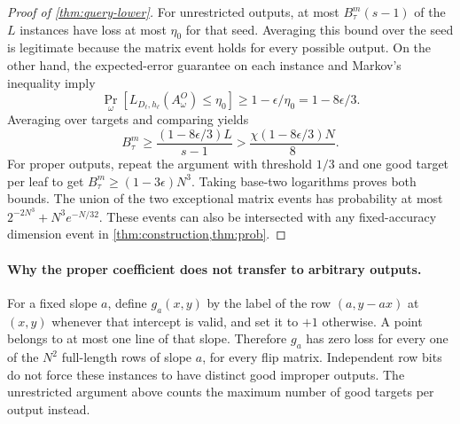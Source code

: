\begin{proof}[Proof of \cref{thm:query-lower}]
For unrestricted outputs, at most $B_\tau^m(s-1)$ of the $L$ instances have loss at most $\eta_0$ for that seed. Averaging this bound over the seed is legitimate because the matrix event holds for every possible output. On the other hand, the expected-error guarantee on each instance and Markov's inequality imply
\[
 \Pr_\omega[L_{D_\ell,h_\ell}(A^O_\omega)\le\eta_0]
 \ge1-\epsilon/\eta_0=1-8\epsilon/3.
\]
Averaging over targets and comparing yields
\[
 B_\tau^m\ge
 \frac{(1-8\epsilon/3)L}{s-1}
 >\frac{\chi(1-8\epsilon/3)N}{8}.
\]
For proper outputs, repeat the argument with threshold $1/3$ and one good target per leaf to get $B_\tau^m\ge(1-3\epsilon)N^3$. Taking base-two logarithms proves both bounds. The union of the two exceptional matrix events has probability at most $2^{-2N^3}+N^3e^{-N/32}$. These events can also be intersected with any fixed-accuracy dimension event in \cref{thm:construction,thm:prob}.
\end{proof}

\paragraph{Why the proper coefficient does not transfer to arbitrary outputs.}
For a fixed slope $a$, define $g_a(x,y)$ by the label of the row $(a,y-ax)$ at $(x,y)$ whenever that intercept is valid, and set it to $+1$ otherwise. A point belongs to at most one line of that slope. Therefore $g_a$ has zero loss for every one of the $N^2$ full-length rows of slope $a$, for every flip matrix. Independent row bits do not force these instances to have distinct good improper outputs. The unrestricted argument above counts the maximum number of good targets per output instead.
